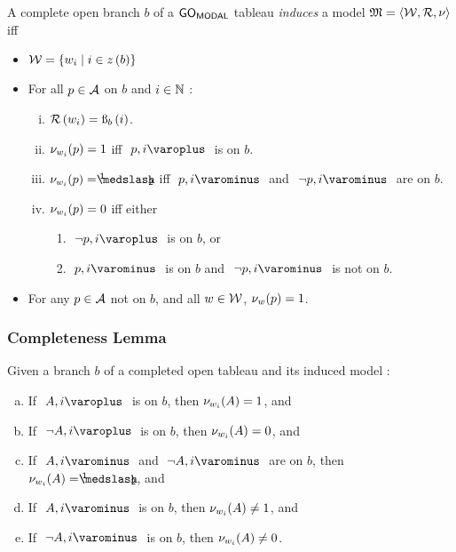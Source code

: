 \begin{definition}\label{inducedModel}
A complete open branch $ b $ of a $ \mathsf{GO}_{\mathsf{MODAL}} $ tableau \emph{induces} a model $ \mathfrak{M} = \langle { \ensuremath{\mathcal{W}}, \ensuremath{\mathcal{R}}, \ensuremath{\mathcal{\nu}}}\rangle $ iff
 	\begin{itemize}
		\item $ \mathcal{W} = \left\{{ w_i \mid i \in z\left({b}\right) }\right\} $
		\item For all $ p \in \mathcal{A} $ on $ b $ and $ i \in \mathbb{N} $ :
		\begin{enumerate}[(i)]
			\item $ \mathcal{R}\left({ w_i }\right) = \text{\ss}_{b}\left({ i }\right) $.
			\item $ \mathcal{\nu}_{ w_i }({ p }) = 1 $ iff $ \like{ \dNodei{ p }} $ is on $ b $.
			\item $ \Valwi{ p } = \oneHalf $ iff $ \like{ \uNodei{ p }} $ and $ \like{ \uNodei{ \neg p }} $ are on $ b $.
			\item $ \mathcal{\nu}_{ w_i }({ p }) = 0 $ iff either 
			\begin{enumerate}
				\item $ \like{ \dNodei{ \neg p }} $ is on $ b $, or
				\item $ \like{ \uNodei{ p } } $ is on $ b $ and $ \like{ \uNodei{ \neg p } } $ is not on $ b $.
			\end{enumerate}
		\end{enumerate}
		\item For any $ p \in \mathcal{A} $ not on $ b $, and all $ w \in \mathcal{W} $, $ \mathcal{\nu}_{ w }({ p }) = 1 $.
	\end{itemize}
\end{definition}

\subsubsection{Completeness Lemma}

\begin{lem}\label{completenessLemma}
Given a branch $ b $ of a completed open tableau and its induced model \Model:
	\begin{enumerate}[(a)]
	\item\label{cl1} If $ \like{ \dNodei{ A }} $ is on $ b $, then $ \mathcal{\nu}_{ w_i }({ A }) = 1 $, and
	\item\label{cl0} If $ \like{ \dNodei{ \neg A }} $ is on $ b $, then $ \mathcal{\nu}_{ w_i }({ A }) = 0 $, and
	\item\label{cl.5} If $ \like{ \uNodei{ A }} $ and $ \like{ \uNodei{ \neg A } } $ are on $ b $, then $ \Valwi{ A } = \oneHalf $, and 
	\item\label{clneq1} If $ \like{ \uNodei{ A }} $ is on $ b $, then $ \mathcal{\nu}_{ w_i }({ A }) \neq 1 $, and
	\item\label{clneq0} If $ \like{ \uNodei{ \neg A }} $ is on $ b $, then $ \mathcal{\nu}_{ w_i }({ A }) \neq 0 $.
	\end{enumerate}
\end{lem}

